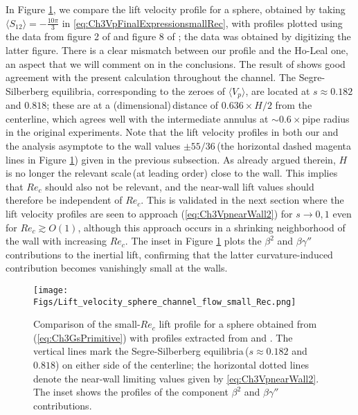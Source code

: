 \documentclass{jfm}
\begin{document}
In Figure \ref{fig:Ch3smallRecComparison}, we compare the lift velocity profile for a sphere, obtained by taking $\langle S_{12} \rangle = -\frac{10\pi}{3}$  in \eqref{eq:Ch3VpFinalExpressionsmallRec}, with profiles plotted using the data from figure 2 of \cite{holeal1974} and figure 8 of \cite{vasseur1976}; the data was obtained by digitizing the latter figure. There is a clear mismatch between our profile and the Ho-Leal one, an aspect that we will comment on in the conclusions. The result of \cite{vasseur1976} shows good agreement with the present calculation throughout the channel. The Segre-Silberberg equilibria, corresponding to the zeroes of $\langle V_p\rangle$, are located at $s\approx 0.182$ and $0.818$; these are at a (dimensional)\,distance of $0.636\times H/2$ from the centerline, which agrees well with the intermediate annulus at $\sim0.6\times$pipe radius in the original experiments\citep{segresilberberg1962a}. Note that the lift velocity profiles in both our and the \cite{vasseur1976} analysis asymptote to the wall values $\pm 55/36$\,(the horizontal dashed magenta lines in Figure \ref{fig:Ch3smallRecComparison}) given in the previous subsection. As already argued therein, $H$ is no longer the relevant scale\,(at leading order) close to the wall. This implies that $Re_c$ should also not be relevant, and the near-wall lift values should therefore be independent of $Re_c$. This is validated in the next section where the lift velocity profiles are seen to approach (\ref{eq:Ch3VpnearWall2}) for $s \to 0,1$ even for $Re_c\gtrsim O(1)$, although this approach occurs in a shrinking neighborhood of the wall with increasing  $Re_c$. The inset in Figure \ref{fig:Ch3smallRecComparison} plots the $\beta^2$ and $\beta\gamma''$ contributions to the inertial lift, confirming that the latter curvature-induced contribution becomes vanishingly small at the walls.

\begin{figure}
	\centering
	\texttt{[image: Figs/Lift\_velocity\_sphere\_channel\_flow\_small\_Rec.png]}
	\caption{Comparison of the small-$Re_c$ lift profile for a sphere obtained from (\ref{eq:Ch3GsPrimitive})  with profiles extracted from \cite{holeal1974} and \cite{vasseur1976}. The vertical lines mark the Segre-Silberberg equilibria\,($s\approx0.182$ and $0.818$) on either side of the centerline; the horizontal dotted lines denote the near-wall limiting values given by \eqref{eq:Ch3VpnearWall2}. The inset shows the profiles of the component $\beta^2$ and $\beta\gamma''$ contributions.}
	\label{fig:Ch3smallRecComparison}
\end{figure}
\end{document}
